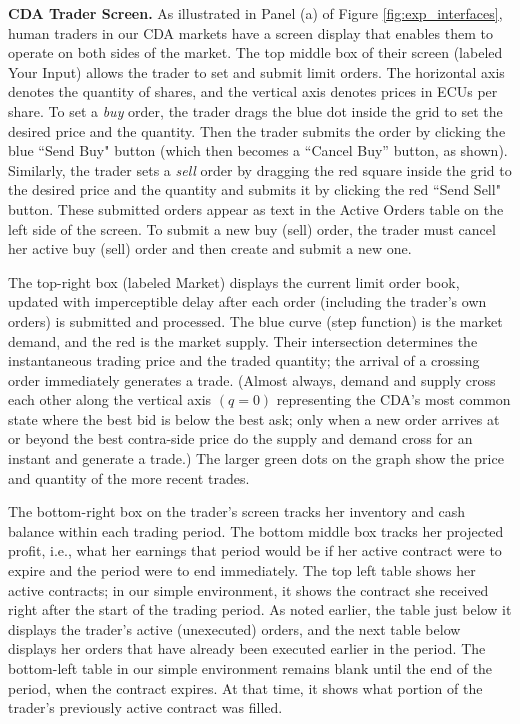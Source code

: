 \documentclass[12pt]{article}
\begin{document}
\bigskip
\noindent
\textbf{CDA Trader Screen.}
As illustrated 
in Panel (a) of Figure \ref{fig:exp_interfaces}, human traders in our CDA markets have a screen display that enables them to operate on both sides of the market.
The top middle box of their screen
(labeled Your Input) allows the trader to set and submit limit orders. The horizontal axis denotes the quantity of shares, and the vertical axis denotes prices in ECUs per share. To set a \textit{buy} order, the trader drags the blue dot inside the grid to set the desired price and the quantity. 
Then the trader submits the order by clicking the blue ``Send Buy" button (which then becomes a ``Cancel Buy'' button, as shown). 
Similarly, the trader sets a \textit{sell} order by dragging the red square inside the grid to the desired price and the quantity and submits it by clicking the red  ``Send Sell" button. 
These submitted orders appear as  text in the Active Orders table on the left side of the screen. 
To submit a new buy (sell) order, the trader must cancel her active buy (sell) order and then create and submit a new one. 

The top-right box (labeled Market) displays the current limit order book, updated with imperceptible delay after each order 
(including the trader's own orders) is submitted and processed. 
The blue curve (step function) 
is the market demand, and the red is the market supply. Their intersection determines the instantaneous trading price and the traded quantity;
the arrival of a crossing order immediately generates a trade.
(Almost always, demand and supply cross each other along the vertical axis $(q=0)$ representing the CDA's most common state where the best bid is below the best ask; only when a new order arrives at or beyond the best contra-side price do the supply and demand cross for an instant and generate a trade.) 
The larger green dots on the graph show the price and quantity of the more recent trades.

The bottom-right box on the trader's screen tracks her inventory and cash balance within each trading period. 
The bottom middle box tracks her projected profit, i.e., what her earnings that period would be if her active contract were to expire and the period were to end immediately. 
The top left table shows her active contracts; in our simple environment, it shows the contract she received right after the start of the trading period. 
As noted earlier, the table just below it displays the trader's active (unexecuted) orders, and 
the next table below displays her orders that have already been executed earlier in the period. 
The bottom-left table in our simple environment remains blank until the end of the period, when the contract expires. At that time, it shows what portion of the trader's previously active contract was filled. 
\end{document}
